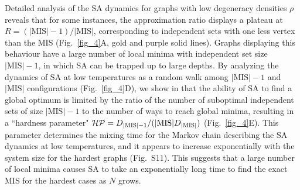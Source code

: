 \documentclass[twocolumn,amssymb,secnumarabic, prl, aps, nofootinbib]{revtex4-1}
\newcommand{\DMIS}{D_{|\textnormal{MIS}|}}
\newcommand{\DMISminusone}{D_{|\textnormal{MIS}|-1}}
\begin{document}
Detailed analysis of the SA dynamics for graphs with low degeneracy densities $\rho$ reveals that for some instances, the approximation ratio displays a plateau at $R = (|\text{MIS}|-1)/|\text{MIS}|$, corresponding to independent sets with one less vertex than the MIS (Fig.~\ref{fig_4}A, gold and purple solid lines). Graphs displaying this behaviour have a large number of local minima with independent set size $|\text{MIS}|-1$, in which SA can be trapped up to large depths. By analyzing the dynamics of SA at low temperatures as a random walk among $|\text{MIS}|-1$ and $|\text{MIS}|$ configurations (Fig.~\ref{fig_4}D), we show in \cite{SI} that the ability of SA to find a global optimum is limited by the ratio of the number of suboptimal independent sets of size $|\text{MIS}|-1$ to the number of ways to reach global minima, resulting in  a ``hardness parameter"  $\mathcal{HP} =  {\DMISminusone}/({|\text{MIS}| \DMIS})$ (Fig.~\ref{fig_4}E). This parameter determines the mixing time for the Markov chain describing the SA dynamics at low temperatures, and it appears to increase exponentially with the system size for the hardest graphs (Fig.~S11). This suggests that a large number of local minima causes SA to take an exponentially long time to find the exact MIS for the hardest cases as $N$ grows. \\
\end{document}
